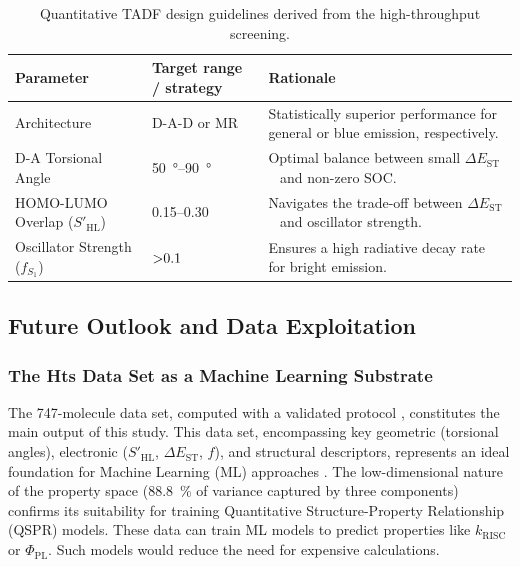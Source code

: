 \documentclass[journal=jcisd8,manuscript=article,keywords=true]{achemso}
\newcommand{\deltaest}{$\Delta E_{\text{ST}}$}
\begin{document}
{
\renewcommand{\arraystretch}{1.25}
\begin{table}[!ht]
\caption{Quantitative TADF design guidelines derived from the high-throughput screening.}
\label{tab:design_guidelines}
\begin{tabularx}{\linewidth}{>{\raggedright\arraybackslash}m{}
>{\raggedright\arraybackslash}m{}m{}}
\toprule
\textbf{Parameter}                   & \textbf{Target range / strategy} &
\textbf{Rationale}                                                             \\ \midrule
Architecture                         & D-A-D or MR                      &
\parbox[c]{0.45\textwidth}{Statistically superior performance for general or blue
emission, respectively.} \\
D-A Torsional Angle                  & \qtyrange{50}{90}{\degree}       & Optimal balance
between small \deltaest~ and non-zero SOC.                    \\
HOMO-LUMO Overlap ($S'_{\text{HL}}$) & \numrange{0.15}{0.30}            & Navigates the
trade-off between \deltaest~ and oscillator strength.           \\
Oscillator Strength ($f_{S_1}$)      & $\num{> 0.1}$                          & Ensures a
high radiative decay rate for bright emission.                       \\ \bottomrule
\end{tabularx}
\end{table}
}

\subsection{Future Outlook and Data Exploitation}\label{sec:data_ml}

\subsubsection{The Hts Data Set as a Machine Learning Substrate}
The 747-molecule data set, computed with a validated protocol \cite{TchapetArxivA1-2025}, constitutes the main output of this study. This data set, encompassing key geometric (torsional angles), electronic ($S'_{\text{HL}}$, \deltaest, $f$), and structural descriptors, represents an ideal foundation for Machine Learning (ML) approaches \cite{Friederich2021ML, Lee2021ML}. The low-dimensional nature of the property space (\qty{88.8}{\percent} of variance captured by three components) confirms its suitability for training Quantitative Structure-Property Relationship (QSPR) models. These data can train ML models to predict properties like $k_{\text{RISC}}$ or $\Phi_{\text{PL}}$. Such models would reduce the need for expensive calculations.
\end{document}
